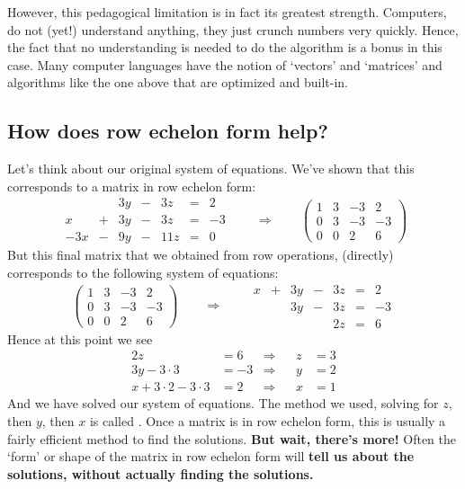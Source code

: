 \documentclass{ximera}
\begin{document}
However, this pedagogical limitation is in fact its greatest
strength. Computers, do not (yet!) understand anything, they just
crunch numbers very quickly. Hence, the fact that no understanding is
needed to do the algorithm is a bonus in this case. Many computer
languages have the notion of `vectors' and `matrices' and algorithms
like the one above that are optimized and built-in.




\subsection{How does row echelon form help?}

Let's think about our original system of equations. We've shown that
this corresponds to a matrix in row echelon form:
\[
  \begin{array}{rcrcrcr}
    & & 3y &-& 3z &=& 2 \\
    x& +&3y&-&3z&=&-3\\
    -3x& -&9y&-&11z&=&0
  \end{array}
  \qquad\Longrightarrow\qquad
  \left(
    \begin{array}{ccc|c}
      1 &   3 & -3 & 2  \\
      0 &   3 & -3 & -3 \\
      0& 0  & 2 & 6
    \end{array}
  \right)
\]
But this final matrix that we obtained from row operations, (directly)
corresponds to the following system of equations:
\[
  \left(
    \begin{array}{ccc|c}
      1 &   3 & -3 & 2  \\
      0 &   3 & -3 & -3 \\
      0& 0  & 2 & 6
    \end{array}
  \right)
  \qquad\Longrightarrow\qquad
  \begin{array}{ccccccc}
    x  &+ & 3y &-& 3z &=& 2 \\
       &  &3y&-&3z&=&-3\\
       & & & &2z&=&6
  \end{array}
\]
Hence at this point we see
\begin{align*}
  2z &= 6 &\Rightarrow  & & z &= 3\\
  3y-3\cdot 3 &= -3 &\Rightarrow  & & y &= 2\\
  x + 3\cdot 2 - 3\cdot 3 &= 2  &\Rightarrow & & x &= 1
\end{align*}
And we have solved our system of equations. The method we used,
solving for $z$, then $y$, then $x$ is called . Once a matrix is in row echelon form, this is usually
a fairly efficient method to find the solutions.  \textbf{But wait,
  there's more!}  Often the `form' or shape of the matrix in row
echelon form will \textbf{tell us about the solutions, without
  actually finding the solutions.}
\end{document}
